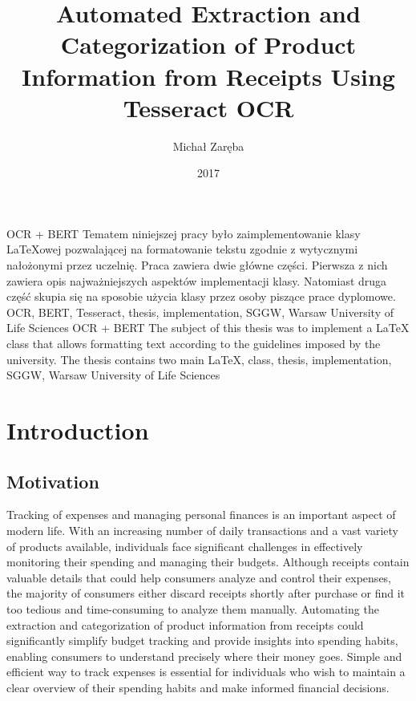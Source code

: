 \documentclass{SGGW-thesis-EN}
\title{Automated Extraction and Categorization of Product Information from Receipts Using Tesseract OCR}
\author{Michał Zaręba}
\date{2017}
\begin{document}
\maketitle
\statementpage
\abstractpage
{OCR + BERT}
{Tematem niniejszej pracy było zaimplementowanie klasy \LaTeX{}owej pozwalającej na formatowanie tekstu zgodnie z wytycznymi nałożonymi przez uczelnię. Praca zawiera dwie
główne części. Pierwsza z nich zawiera opis najważniejszych aspektów implementacji klasy. Natomiast druga część skupia się na sposobie użycia klasy przez osoby piszące prace
dyplomowe.}
{OCR, BERT, Tesseract, thesis, implementation, SGGW, Warsaw University of Life Sciences}
{OCR + BERT}
{The subject of this thesis was to implement a \LaTeX{} class that allows formatting text according to the guidelines imposed by the university. The thesis contains two main}
{LaTeX, class, thesis, implementation, SGGW, Warsaw University of Life Sciences}



\tableofcontents


\startchapterfromoddpage %

\chapter{Introduction}

\section{Motivation}
Tracking of expenses and managing personal finances is an important aspect of modern life.
With an increasing number of daily transactions and a vast variety of products available, individuals face significant challenges in effectively monitoring their spending and managing their budgets. 
Although receipts contain valuable details that could help consumers analyze and control their expenses, 
the majority of consumers either discard receipts shortly after purchase or find it too tedious and time-consuming to analyze them manually. 
Automating the extraction and categorization of product information from receipts could significantly simplify budget tracking and provide insights into spending habits, enabling consumers to understand precisely where their money goes.
Simple and efficient way to track expenses is essential for individuals who wish to maintain a clear overview of their spending habits and make informed financial decisions. 
\end{document}
